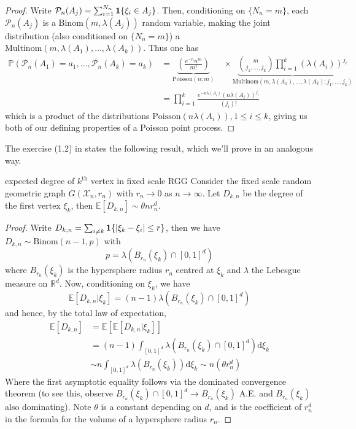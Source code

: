 \documentclass{article}
\begin{document}
\begin{proof}
Write $\mathcal{P}_n(A_j) = \sum_{i=1}^{N_n} {\bf 1}\{\xi_i \in A_j\}$. Then, conditioning on $\{N_n = m\}$, each 
$\mathcal{P}_n(A_j)$ is a $\text{Binom}(m, \lambda(A_j))$ random variable, making the joint distribution (also 
conditioned on $\{N_n = m\}$) a $\text{Multinom}(m, \lambda(A_1), \dots, \lambda(A_k))$. Thus one has 
\begin{align*}\mathbb{P}(\mathcal{P}_n(A_1) = a_1, \dots, \mathcal{P}_n(A_k) = a_k) &= 
\underbrace{\left(\frac{e^{-n}n^m}{m!}\right)}_{\text{Poisson}(n ; m)} \quad \times 
\underbrace{\binom{m}{j_1, \dots, j_k}\prod_{i=1}^k {(\lambda(A_i))}^{j_i}}_{\text{Multinom}(m, \lambda(A_1), \dots, \lambda(A_k) ; j_1, \dots, j_k)} \\
&= \prod_{i=1}^k \frac{e^{-n\lambda(A_i)}(n\lambda(A_i))^{j_i}}{(j_i)!}
\end{align*}
which is a product of the distributions $\text{Poisson}(n\lambda(A_i)), 1 \leq i \leq k$, giving us both of our 
defining properties of a Poisson point process. 
\end{proof}

The exercise (1.2) in \cite{Penrose_et_al_2016} states the following result, which we'll prove in an analogous way.

\begin{proposition}[]{expected degree of $k^\text{th}$ vertex in fixed scale RGG}
    Consider the fixed scale random geometric graph $G(\mathcal{X}_n, r_n)$ with $r_n \to 0$ as $n \to \infty$. Let 
    $D_{k, n}$ be the degree of the first vertex $\xi_k$, then $\mathbb{E}[D_{k, n}] \sim \theta n r_n^d$.
\end{proposition}

\begin{proof}
Write $D_{k,n} = \sum_{i \neq k} {\bf 1}\{\lvert \xi_k - \xi_i \rvert \leq r\}$, then we have $D_{k,n} \sim 
\text{Binom}(n-1, p)$ with \[p = \lambda(B_{r_n}(\xi_k) \cap [0,1]^d)\] where $B_{r_n}(\xi_k)$ is the hypersphere 
radius $r_n$ centred at $\xi_k$ and $\lambda$ the Lebesgue measure on $\mathbb{R}^d$. Now, conditioning on $\xi_k$, 
we have \[\mathbb{E}[D_{k,n} | \xi_k] = (n-1)\lambda(B_{r_n}(\xi_k) \cap [0,1]^d)\]
and hence, by the total law of expectation, 
\begin{align*}
    \mathbb{E}[D_{k,n}] &= \mathbb{E}[\mathbb{E}[D_{k,n} | \xi_k]] \\
    &= (n-1)\int_{[0,1]^d}\lambda(B_{r_n}(\xi_k) \cap [0,1]^d)\mathrm{d}\xi_k \\
    &\sim n\int_{[0,1]^d}\lambda(B_{r_n}(\xi_k))\mathrm{d}\xi_k \sim n(\theta r_n^d)
\end{align*}
Where the first asymptotic equality follows via the dominated convergence theorem (to see this, observe $B_{r_n}(\xi_k) \cap [0,1]^d 
\to B_{r_n}(\xi_k)$ A.E. and $B_{r_n}(\xi_k)$ also dominating). Note $\theta$ is a constant depending on $d$, 
and is the coefficient of $r_n^d$ in the formula for the volume of a hypersphere radius $r_n$.
\end{proof}
\end{document}
